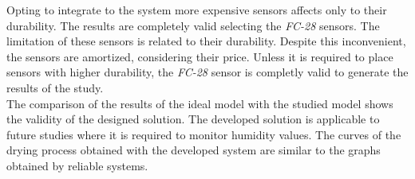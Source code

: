 Opting to integrate to the system more expensive sensors affects only to their durability. The results are completely valid selecting the \textit{FC-28} sensors. The limitation of these sensors is related to their durability. Despite this inconvenient, the sensors are amortized, considering their price. Unless it is required to place sensors with higher durability, the \textit{FC-28} sensor is completly valid to generate the results of the study.\\

The comparison of the results of the ideal model with the studied model shows the validity of the designed solution. The developed solution is applicable to future studies where it is required to monitor humidity values. The curves of the drying process obtained with the developed system are similar to the graphs obtained by reliable systems.\\

\newpage
\newpage

